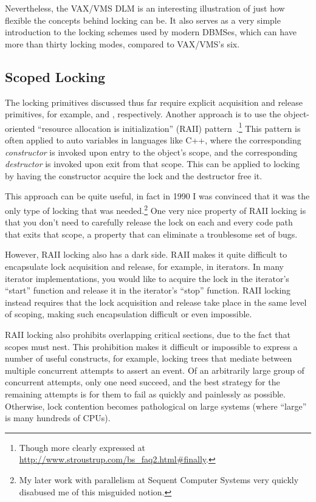 Nevertheless, the VAX/VMS DLM is an interesting illustration of just
how flexible the concepts behind locking can be.
It also serves as a very simple introduction to the locking schemes
used by modern DBMSes, which can have more than thirty locking modes,
compared to VAX/VMS's six.

\subsection{Scoped Locking}
\label{sec:locking:Scoped Locking}

The locking primitives discussed thus far require explicit acquisition and
release primitives, for example,  and ,
respectively.
Another approach is to use the object-oriented ``resource allocation
is initialization'' (RAII) pattern~\cite{MargaretAEllis1990Cplusplus}.\footnote{
	Though more clearly expressed at
	\url{http://www.stroustrup.com/bs_faq2.html\#finally}.}
This pattern is often applied to auto variables in languages like C++,
where the corresponding \emph{constructor} is invoked upon entry to
the object's scope, and the corresponding \emph{destructor} is invoked
upon exit from that scope.
This can be applied to locking by having the constructor acquire the
lock and the destructor free it.

This approach can be quite useful, in fact in 1990 I was convinced that it
was the only type of locking that was needed.\footnote{
	My later work with parallelism at Sequent Computer Systems very
	quickly disabused me of this misguided notion.}
One very nice property of RAII locking is that you don't need to carefully
release the lock on each and every code path that exits that scope,
a property that can eliminate a troublesome set of bugs.

However, RAII locking also has a dark side.
RAII makes it quite difficult to encapsulate lock acquisition and release,
for example, in iterators.
In many iterator implementations, you would like to acquire the lock in
the iterator's ``start'' function and release it in the iterator's ``stop''
function.
RAII locking instead requires that the lock acquisition and release take
place in the same level of scoping, making such encapsulation difficult or
even impossible.

RAII locking also prohibits overlapping critical sections, due to the fact
that scopes must nest.
This prohibition makes it difficult or impossible to express a number of
useful constructs, for example, locking trees
that mediate between multiple concurrent attempts to assert an event.
Of an arbitrarily large group of concurrent attempts, only one need succeed,
and the best strategy for the remaining attempts is for them to fail as
quickly and painlessly as possible.
Otherwise, lock contention becomes pathological on large systems
(where ``large'' is many hundreds of CPUs).

